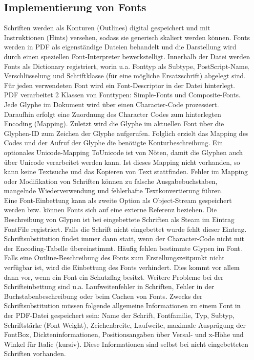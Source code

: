 \subsection{Implementierung von Fonts}
Schriften werden als Konturen (Outlines) digital gespeichert und mit Instruktionen (Hints) versehen, sodass sie generisch skaliert werden können. Fonts werden in PDF als eigenständige Dateien behandelt und die Darstellung wird durch einen speziellen Font-Interpreter bewerkstelligt. Innerhalb der Datei werden Fonts als Dictionary registriert, worin u.a. Fonttyp als Subtype, PostScript-Name, Verschlüsselung und Schriftklasse (für eine mögliche Ersatzschrift) abgelegt sind. Für jeden verwendeten Font wird ein Font-Descriptor in der Datei hinterlegt. PDF verarbeitet 2 Klassen von Fonttypen: Simple-Fonts und Composite-Fonts. \\
Jede Glyphe im Dokument wird über einen Character-Code prozessiert. Daraufhin erfolgt eine Zuordnung des Character Codes zum hinterlegten Encoding (Mapping). Zuletzt wird die Glyphe im aktuellen Font über die Glyphen-ID zum Zeichen der Glyphe aufgerufen. Folglich erzielt das Mapping des Codes und der Aufruf der Glyphe die benötigte Konturbeschreibung. Ein optionales Unicode-Mapping ToUnicode ist von Nöten, damit die Glyphen auch über Unicode verarbeitet werden kann. Ist dieses Mapping nicht vorhanden, so kann keine Textsuche und das Kopieren von Text stattfinden. Fehler im Mapping oder Modifikation von Schriften können zu falsche Ausgabebuchstaben, mangelnde Wiederverwendung und fehlerhafte Textkonvertierung führen. \\
Eine Font-Einbettung kann als zweite Option als Object-Stream gespeichert werden bzw. können Fonts sich auf eine externe Referenz beziehen. Die Beschreibung von Glypen ist bei eingebettete Schriften als Steam im Eintrag FontFile registriert. Falls die Schrift nicht eingebettet wurde fehlt dieser Eintrag. Schriftsubstitution findet immer dann statt, wenn der Character-Code nicht mit der Encoding-Tabelle übereinstimmt. Häufig fehlen bestimmte Glypen im Font. Falls eine Outline-Beschreibung des Fonts zum Erstellungszeitpunkt nicht verfügbar ist, wird die Einbettung des Fonts verhindert. Dies kommt vor allem dann vor, wenn ein Font ein Schutzflag besitzt. Weitere Probleme bei der Schrifteinbettung sind u.a. Laufweitenfehler in Schriften, Fehler in der Buchstabenbeschreibung oder beim Cachen von Fonts. Zwecks der Schriftsubstitution müssen folgende allgemeine Informationen zu einem Font in der PDF-Datei gespeichert sein: Name der Schrift, Fontfamilie, Typ, Subtyp, Schriftstärke (Font Weight), Zeichenbreite, Laufweite, maximale Ausprägung der FontBox, Dickteninformationen, Positionsangaben über Versal- und x-Höhe und Winkel für Italic (kursiv). Diese Informationen sind selbst bei nicht eingebetteten Schriften vorhanden.  \cite{schneeberger} 